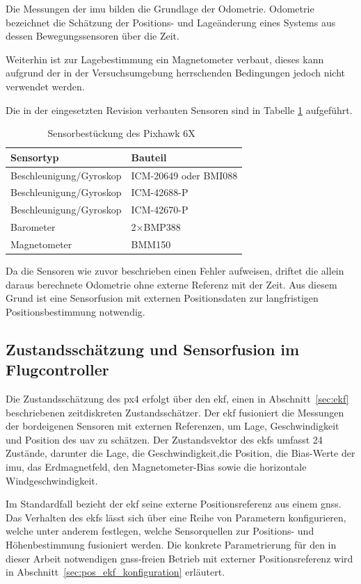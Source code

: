 Die Messungen der \gls{imu} bilden die Grundlage der Odometrie.
Odometrie bezeichnet die Schätzung der Positions- und Lageänderung eines Systems aus dessen Bewegungssensoren über die Zeit.


Weiterhin ist zur Lagebestimmung ein Magnetometer verbaut, dieses kann aufgrund der in der Versuchsumgebung herrschenden Bedingungen jedoch nicht verwendet werden.

Die in der eingesetzten Revision verbauten Sensoren sind in Tabelle 
\ref{tab:pixhawk_sensoren} aufgeführt.
\begin{table}[htbp]
\centering
\begin{tabular}{ll}
\toprule
\textbf{Sensortyp} & \textbf{Bauteil} \\
\midrule
        Beschleunigung/Gyroskop & ICM-20649 oder BMI088 \\
        Beschleunigung/Gyroskop & ICM-42688-P \\
        Beschleunigung/Gyroskop & ICM-42670-P \\
        Barometer & 2$\times$BMP388 \\
        Magnetometer & BMM150 \\
\bottomrule
\end{tabular}
\caption{Sensorbestückung des Pixhawk 6X~\cite{px4_pixhawk6x_doc}}
\label{tab:pixhawk_sensoren}
\end{table}
\FloatBarrier
\noindent
Da die Sensoren wie zuvor beschrieben einen Fehler aufweisen, driftet die allein daraus berechnete Odometrie ohne externe Referenz mit der Zeit.
Aus diesem Grund ist eine Sensorfusion mit externen Positionsdaten zur langfristigen Positionsbestimmung notwendig.

\subsection*{Zustandsschätzung und Sensorfusion im Flugcontroller}
\label{sec:ekf_px4}
Die Zustandsschätzung des \gls{px4} erfolgt über den \gls{ekf}, einen in Abschnitt~\ref{sec:ekf} beschriebenen zeitdiskreten Zustandsschätzer.
Der \gls{ekf} fusioniert die Messungen der bordeigenen Sensoren mit externen 
Referenzen, um Lage, Geschwindigkeit und Position des \gls{uav} zu schätzen.
Der Zustandsvektor des \gls{ekf}s umfasst 24 Zustände, darunter die Lage, 
die Geschwindigkeit,die Position, die Bias-Werte der \gls{imu}, das 
Erdmagnetfeld, den Magnetometer-Bias sowie die horizontale Windgeschwindigkeit.~\cite{Ko2018}

Im Standardfall bezieht der \gls{ekf} seine externe Positionsreferenz aus einem \gls{gnss}.
Das Verhalten des \gls{ekf}s lässt sich über eine Reihe von Parametern konfigurieren, 
welche unter anderem festlegen, welche Sensorquellen zur Positions- und Höhenbestimmung 
fusioniert werden.
Die konkrete Parametrierung für den in dieser Arbeit notwendigen \gls{gnss}-freien Betrieb mit externer Positionsreferenz 
wird in Abschnitt~\ref{sec:pos_ekf_konfiguration} erläutert.





